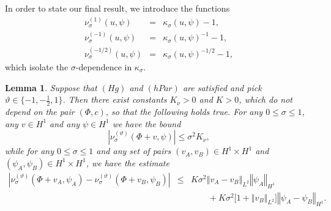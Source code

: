 \documentclass[10pt]{articleHJ}
\newcommand{\abs}[1]{\left\vert#1\right\vert}			%
\newcommand{\norm}[1]{\left\Vert#1\right\Vert}		%
\newtheorem{lem}[thm]{Lemma}
\numberwithin{equation}{section}
\begin{document}
In order to state our final result,
we introduce the functions
\begin{equation}
\label{eq:prlm:defs:nu}
\begin{array}{lcl}
\nu^{(1)}_{\sigma}(u, \psi) & = & \kappa_{\sigma}(u, \psi) - 1 ,
\\[0.2cm]
\nu^{(-1)}_{\sigma}(u, \psi) & =  &
    \kappa_{\sigma}(u, \psi)^{-1} - 1 ,
\\[0.2cm]
\nu^{(-1/2)}_{\sigma}(u, \psi) & =  &
    \kappa_{\sigma}(u, \psi)^{-1/2} - 1,
\end{array}
\end{equation}
which isolate the $\sigma$-dependence in $\kappa_{\sigma}$.


\begin{lem}
\label{lem:prlm:nu}
Suppose that $(Hg)$ and $(hPar)$
are satisfied and pick
$\vartheta \in \{-1, -\frac{1}{2} ,1 \}$.
Then there exist constants $K_{\nu} > 0$ and $K > 0$, which do not
depend on the pair $(\Phi, c)$, so that the following holds true.
For any
$0 \le \sigma \le 1$,
any
$v \in H^1$
and any $\psi\in H^1$
we have the bound
\begin{equation}
\label{eq:prlm:nu:abs:bnd}
\abs{ \nu_{\sigma}^{(\vartheta)}(\Phi + v, \psi) }
  \le \sigma^2 K_\nu ,
\end{equation}
while for any
$0 \le \sigma \le 1$
and any
set of pairs
$(v_A, v_B) \in H^1 \times H^1$
and $(\psi_A, \psi_B) \in H^1 \times H^1$,
we have the estimate
\begin{equation}
\label{eq:prlm:lip:bnds:nu}
\begin{array}{lcl}
\abs{
  \nu^{(\vartheta)}_{\sigma} ( \Phi + v_A, \psi_A)
    - \nu^{(\vartheta)}_{\sigma} ( \Phi + v_B, \psi_B)
} & \le &
  K \sigma^2
   \norm{v_A-v_B}_{L^2} \norm{\psi_A}_{H^1}
\\[0.2cm]
& & \qquad
 + K \sigma^2 \big[ 1 +  \norm{v_B}_{L^2} \big]
   \norm{\psi_A -\psi_B}_{H^1}.
\end{array}
\end{equation}
\end{lem}
\end{document}
